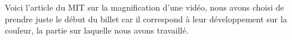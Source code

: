 Voici l'article du MIT sur la magnification d'une vidéo, nous avons choisi
de prendre juste le début du billet car il correspond à leur développement 
sur la couleur, la partie sur laquelle nous avons travaillé.


